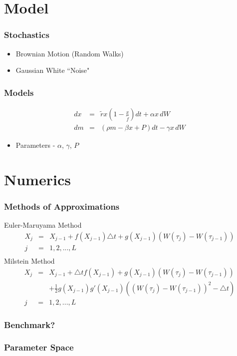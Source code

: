 
\section{Model}

\begin{frame}
    \frametitle{Stochastics}
	\begin{itemize}
		\item Brownian Motion (Random Walks)
		\item Gaussian White ``Noise"
	\end{itemize}
\end{frame}



\begin{frame}
    \frametitle{Models}
	\begin{eqnarray}
		dx &=& \tilde{r} x \left( 1- \frac{x}{\tilde{f}}\right) dt +\alpha x \, dW \\
		dm &=& ( \rho m - \beta x + P) dt - \gamma x \, dW
	\end{eqnarray}
	\begin{itemize}
		\item Parameters - $\alpha$, $\gamma$, $P$
	\end{itemize}
\end{frame}




\section{Numerics}

\begin{frame}
    \frametitle{Methods of Approximations}
	Euler-Maruyama Method
	\begin{eqnarray*}
		X_{j} &=& X_{j-1} + f(X_{j-1})\triangle t+ g(X_{j-1})(W(\tau_{j})-W(\tau_{j-1})) \\
		 j &=& 1,2,... ,L \\
	\end{eqnarray*}
	Milstein Method
	\begin{eqnarray*}
		X_{j} &=& X_{j-1} + \triangle tf(X_{j-1}) + g(X_{j-1})(W(\tau_{j})-W(\tau_{j-1})) 	\nonumber\\ 
		&& + \frac{1}{2} g(X_{j-1})g'(X_{j-1})((W(\tau_{j})-W(\tau_{j-1}))^{2}-\triangle t)
		\\ j &=& 1,2,... ,L		
	\end{eqnarray*}
\end{frame}


\begin{frame}
    \frametitle{Benchmark?}
\end{frame}


\begin{frame}
    \frametitle{Parameter Space}
\end{frame}



